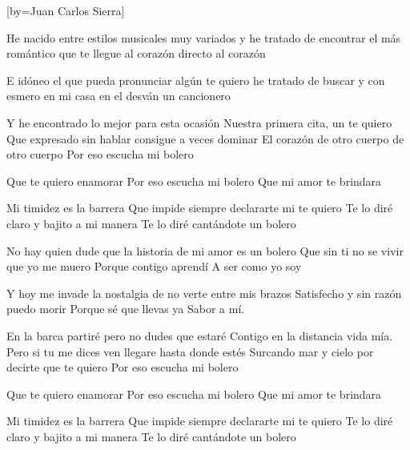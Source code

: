 
[by={Juan Carlos Sierra}]
    \usebox{\E}
    
    \beginverse
        He nacido entre estilos musicales muy variados
        y he tratado de encontrar el más romántico
        que te llegue al corazón
        directo al corazón
    \endverse
    
    \beginverse
        E idóneo el que pueda pronunciar algún te quiero
        he tratado de buscar y con esmero
        en mi casa en el desván
        un cancionero
    \endverse
    
    \beginverse
        Y he encontrado lo mejor para esta ocasión
        Nuestra primera cita, un te quiero
        Que expresado sin hablar consigue a veces dominar
        El corazón de otro cuerpo de otro cuerpo
        Por eso escucha mi bolero
    \endverse
    
    \beginverse
        Que te quiero enamorar
        Por eso escucha mi bolero
        Que mi amor te brindara
    \endverse
    
    \beginverse
        Mi timidez es la barrera
        Que impide siempre declararte mi te quiero
        Te lo diré claro y bajito a mi manera
        Te lo diré cantándote un bolero
    \endverse
    
    \beginverse
        No hay quien dude que la historia de mi amor es un bolero
        Que sin ti no se vivir que yo me muero
        Porque contigo aprendí
        A ser como yo soy
    \endverse
    
    \beginverse
        Y hoy me invade la nostalgia de no verte entre mis brazos
        Satisfecho y sin razón puedo morir
        Porque sé que llevas ya
        Sabor a mí.
    \endverse
    
    \beginverse
        En la barca partiré pero no dudes que estaré
        Contigo en la distancia vida mía.
        Pero si tu me dices ven llegare hasta donde estés
        Surcando mar y cielo por decirte que te quiero
        Por eso escucha mi bolero
    \endverse
    
    \beginverse
        Que te quiero enamorar
        Por eso escucha mi bolero
        Que mi amor te brindara
    \endverse
    
    \beginverse
        Mi timidez es la barrera
        Que impide siempre declararte mi te quiero
        Te lo diré claro y bajito a mi manera
        Te lo diré cantándote un bolero
    \endverse

\endsong

\scleardpage